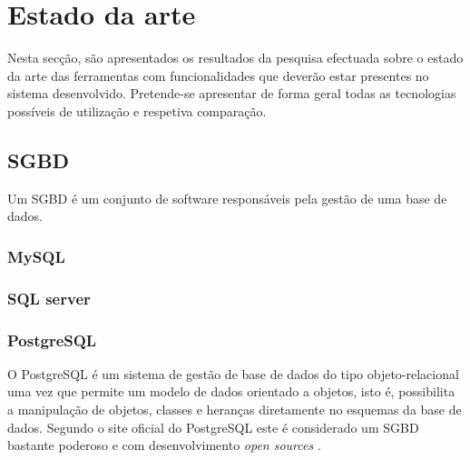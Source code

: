 \chapter{Estado da arte}



Nesta secção, são apresentados os resultados da pesquisa efectuada sobre o
estado da arte das ferramentas com funcionalidades que deverão estar presentes no sistema desenvolvido. Pretende-se apresentar de forma geral todas as tecnologias possíveis de utilização e respetiva comparação. 


\section{\acl{SGBD}}

Um \ac{SGBD} é um conjunto de software responsáveis pela gestão de uma base de dados.






\subsection{MySQL}



\subsection{SQL server}



\subsection{PostgreSQL}

O PostgreSQL é um sistema de gestão de base de dados do tipo objeto-relacional uma vez que permite um modelo de dados orientado a objetos, isto é, possibilita a manipulação de objetos, classes e heranças diretamente no esquemas da base de dados. Segundo o site oficial do PostgreSQL este é considerado um \ac{SGBD} bastante poderoso e com desenvolvimento \textit{open sources} \cite{ThePostgreSQLGlobalDevelopmentGroup2012}. 





